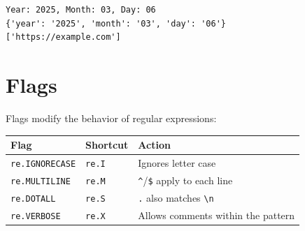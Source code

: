 \documentclass[
  english,
  letterpaper,
  DIV=11,
  numbers=noendperiod]{scrreprt}
\newcounter{none} %
\begin{document}
\begin{verbatim}
Year: 2025, Month: 03, Day: 06
{'year': '2025', 'month': '03', 'day': '06'}
['https://example.com']
\end{verbatim}

\section{Flags}\label{flags}

Flags modify the behavior of regular expressions:

{\def\LTcaptype{none} %
\begin{longtable}[]{@{}lll@{}}
\toprule\noalign{}
Flag & Shortcut & Action \\
\midrule\noalign{}
\endhead
\bottomrule\noalign{}
\endlastfoot
\texttt{re.IGNORECASE} & \texttt{re.I} & Ignores letter case \\
\texttt{re.MULTILINE} & \texttt{re.M} & \texttt{\^{}}/\texttt{\$} apply
to each line \\
\texttt{re.DOTALL} & \texttt{re.S} & \texttt{.} also matches
\texttt{\textbackslash{}n} \\
\texttt{re.VERBOSE} & \texttt{re.X} & Allows comments within the
pattern \\
\end{longtable}
}
\end{document}
